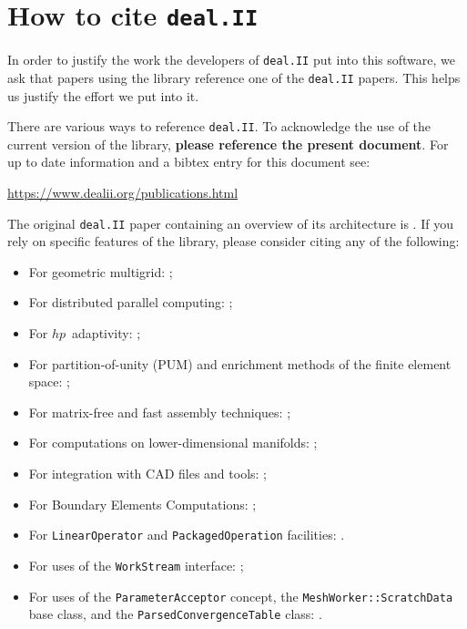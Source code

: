 \documentclass{ansarticle-preprint}
\newcommand{\specialword}[1]{\texttt{#1}}
\newcommand{\dealii}{{\specialword{deal.II}}\xspace}
\begin{document}
\section{How to cite \dealii}\label{sec:cite}

In order to justify the work the developers of \dealii put into this
software, we ask that papers using the library reference one of the
\dealii papers. This helps us justify the effort we put into it.

There are various ways to reference \dealii. To acknowledge the use of
the current version of the library, \textbf{please reference the present
document}. For up to date information and a bibtex entry for this document
see:
\begin{center}
 \url{https://www.dealii.org/publications.html}
\end{center}

The original \texttt{\dealii} paper containing an overview of its
architecture is \cite{BangerthHartmannKanschat2007}. If you rely on
specific features of the library, please consider citing any of the
following:
\begin{itemize}
 \item For geometric multigrid: \cite{Kanschat2004,JanssenKanschat2011,ClevengerHeisterKanschatKronbichler2019};
 \item For distributed parallel computing: \cite{BangerthBursteddeHeisterKronbichler11};
 \item For $hp$~adaptivity: \cite{BangerthKayserHerold2007};
  \item For partition-of-unity (PUM) and enrichment methods of the
    finite element space: \cite{Davydov2016};
 \item For matrix-free and fast assembly techniques:
   \cite{KronbichlerKormann2012,KronbichlerKormann2019};
 \item For computations on lower-dimensional manifolds:
   \cite{DeSimoneHeltaiManigrasso2009};
 \item For integration with CAD files and tools:
   \cite{HeltaiMola2015};
 \item For Boundary Elements Computations:
   \cite{GiulianiMolaHeltai-2018-a};
 \item For \texttt{LinearOperator} and \texttt{PackagedOperation} facilities:
   \cite{MaierBardelloniHeltai-2016-a,MaierBardelloniHeltai-2016-b}.
 \item For uses of the \texttt{WorkStream} interface:
   \cite{TKB16};
   \item For uses of the \texttt{ParameterAcceptor} concept, the
     \texttt{MeshWorker::ScratchData} base class, and the
     \texttt{ParsedConvergenceTable} class: \cite{SartoriGiulianiBardelloni-2018-a}.
\end{itemize}
\end{document}
